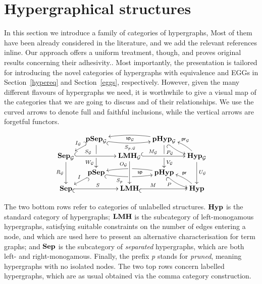 \documentclass[3p]{elsarticle}
\newcommand{\catname}[1]{\textbf{\textup{#1}}}
\newcommand{\lmo}{\catname{LMH}}
\newcommand{\hyp}{\catname{Hyp}}
\newcommand{\phyp}{\catname{pHyp}}
\newcommand{\pshyp}{\catname{pSep}}
\newcommand{\shyp}{\catname{Sep}}
\renewcommand{\sp}{\mathsf{sp}}
\newcommand{\pr}{\mathsf{pr}}
\theoremstyle{remark}
\theoremstyle{definition}
\begin{document}
\section{Hypergraphical structures}\label{sec:hyper}
In this  section we introduce a family of categories of hypergraphs, 
Most of them have been already considered in the literature, and we
add the relevant references inline. Our approach offers a uniform treatment,
though, and proves original results concerning their adhesivity..
Most importantly, the presentation is tailored for introducing the novel categories 
of hypergraphs with equivalence and
EGGs in Section~\ref{hypereq} and Section~\ref{eggs}, respectively.
%
However, given the many different flavours of hypergraphs we need, it is worthwhile to give a visual map of the categories that 
we are going to discuss and of their relationships. 
We use the curved arrows to denote full and faithful inclusions, while the vertical arrows are forgetful functors.

\[
\xymatrix@R=8pt@C=10pt{& \pshyp_\mathcal{G} \ar[dd]_(.7){W_\mathcal{G}}|\hole \ar@/_.2cm/@{_{(}->}[rr]_{S_{p,\mathcal{G}}} \ar@{_{(}->}[dl]_{I_\mathcal{G}} && \phyp_\mathcal{G} \ar[dd]^(.7){V_\mathcal{G}}|\hole \ar@/_.2cm/[ll]^{\sp_\mathcal{G}}\ar@/_.2cm/@{_{(}->}[dr]_(.35){P_\mathcal{G}}\\\shyp_\mathcal{G} \ar@{^{(}->}[rr]^(.35){S_\mathcal{G}} \ar[dd]_{R_\mathcal{G}}&& \lmo_\mathcal{G}  \ar@{^{(}->}[rr]^(.35){M_\mathcal{G}} \ar[dd]_(.25){O_\mathcal{G}}&& \hyp_\mathcal{G} \ar@/_.2cm/[ul]_{\pr_\mathcal{G}} \ar[dd]^{U_\mathcal{G}}\\& \pshyp \ar@/_.2cm/@{_{(}->}[rr]_(.35){S_p}|\hole \ar@{^{(}->}[dl]_{I} && \phyp \ar@/_.2cm/[ll]^(.35){\sp}|\hole\ar@/_.2cm/@{_{(}->}[dr]_(.3){P}\\ \shyp \ar@{_{(}->}[rr]^{S} && \lmo  \ar@{_{(}->}[rr]^(.35){M}&& \hyp \ar@/_.2cm/[ul]_{\pr}}
\]

The two bottom rows refer to categories of unlabelled structures.
$\hyp$ is the standard category of hypergraphs; $\lmo$ is the subcategory of left-monogamous hypergraphs,
satisfying suitable constraints on the number of edges entering a node, and which are used here to present 
an alternative characterisation for term graphs;
and  $\shyp$ is the subcategory of \emph{separated} hypergraphs, which are both 
left- and right-monogamous.
Finally, the prefix \emph{p} stands for \emph{pruned}, meaning hypergraphs with no isolated nodes. 
%
The two top rows concern labelled hypergraphs, which are as usual obtained via the comma category construction.
%
\end{document}

